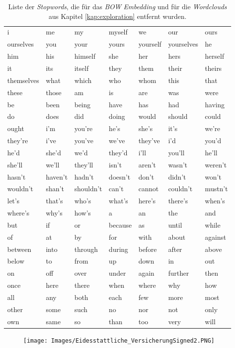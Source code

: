 \documentclass[a4paper,11pt]{article}
\begin{document}
\begin{table}[ht]
\centering
\begin{tabular}{|lllllll|}
  \hline
 i & me & my & myself & we & our & ours \\ 
 ourselves & you & your & yours & yourself & yourselves & he \\ 
  him & his & himself & she & her & hers & herself \\ 
  it & its & itself & they & them & their & theirs \\ 
 themselves & what & which & who & whom & this & that \\ 
   these & those & am & is & are & was & were \\ 
   be & been & being & have & has & had & having \\ 
   do & does & did & doing & would & should & could \\ 
   ought & i'm & you're & he's & she's & it's & we're \\ 
  they're & i've & you've & we've & they've & i'd & you'd \\ 
  he'd & she'd & we'd & they'd & i'll & you'll & he'll \\ 
  she'll & we'll & they'll & isn't & aren't & wasn't & weren't \\ 
  hasn't & haven't & hadn't & doesn't & don't & didn't & won't \\ 
  wouldn't & shan't & shouldn't & can't & cannot & couldn't & mustn't \\ 
  let's & that's & who's & what's & here's & there's & when's \\ 
  where's & why's & how's & a & an & the & and \\ 
  but & if & or & because & as & until & while \\ 
  of & at & by & for & with & about & against \\ 
  between & into & through & during & before & after & above \\ 
  below & to & from & up & down & in & out \\ 
  on & off & over & under & again & further & then \\ 
  once & here & there & when & where & why & how \\ 
  all & any & both & each & few & more & most \\ 
  other & some & such & no & nor & not & only \\ 
  own & same & so & than & too & very & will \\ 
   \hline
\end{tabular}
\caption{Liste der \textit{Stopwords}, die für das \textit{BOW} \textit{Embedding} und für die \textit{Wordclouds} aus Kapitel \ref{kap:exploration} entfernt wurden.}
\label{appendix:Stopwords}

\end{table}





\newpage

\begin{figure}
    \centering
    \vspace*{-2cm}
    \hspace*{-3cm}    
\texttt{[image: Images/Eidesstattliche\_VersicherungSigned2.PNG]}

\end{figure}{}
\end{document}
